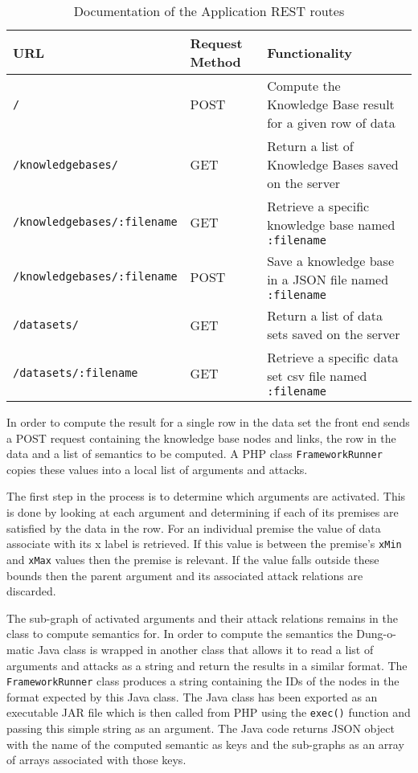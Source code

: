 \begin{table}[]
\centering
\begin{tabular}{|l|l|p{5cm}|}
\hline
 URL & Request Method & Functionality\\ \hline 
 \lstinline{/} & POST & Compute the Knowledge Base result for a given row of data \\
 \lstinline{/knowledgebases/} & GET & Return a list of Knowledge Bases saved on the server \\
 \lstinline{/knowledgebases/:filename} & GET & Retrieve a specific knowledge base named  \lstinline{:filename} \\
 \lstinline{/knowledgebases/:filename} & POST & Save a knowledge base in a JSON file named \lstinline{:filename} \\
 \lstinline{/datasets/} & GET & Return a list of data sets saved on the server \\
 \lstinline{/datasets/:filename} & GET & Retrieve a specific data set csv file named \lstinline{:filename} \\ \hline
\end{tabular}
\caption{Documentation of the Application REST routes}
\label{tab:rest_routes}
\end{table}

In order to compute the result for a single row in the data set the front end sends a POST request containing the knowledge base nodes and links, the row in the data and a list of semantics to be computed. A PHP class \lstinline{FrameworkRunner} copies these values into a local list of arguments and attacks.

The first step in the process is to determine which arguments are activated. This is done by looking at each argument and determining if each of its premises are satisfied by the data in the row. For an individual premise the value of data associate with its x label is retrieved. If this value is between the premise's \lstinline{xMin} and \lstinline{xMax} values then the premise is relevant. If the value falls outside these bounds then the parent argument and its associated attack relations are discarded. 

The sub-graph of activated arguments and their attack relations remains in the class to compute semantics for. In order to compute the semantics the Dung-o-matic Java class is wrapped in another class that allows it to read a list of arguments and attacks as a string and return the results in a similar format. The \lstinline{FrameworkRunner} class produces a string containing the IDs of the nodes in the format expected by this Java class. The Java class has been exported as an executable JAR file which is then called from PHP using the \lstinline{exec()} function and passing this simple string as an argument. The Java code returns JSON object with the name of the computed semantic as keys and the sub-graphs as an array of arrays associated with those keys.

